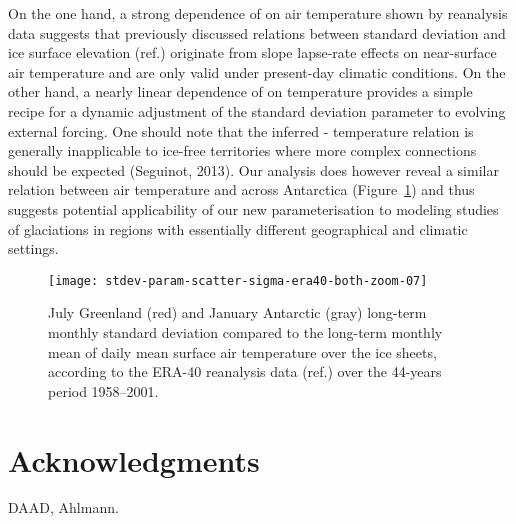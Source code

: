 \documentclass[review]{igs}
\begin{document}
On the one hand, a strong dependence of  on air temperature shown by reanalysis data suggests that previously discussed relations between standard deviation and ice surface elevation (ref.) originate from slope lapse-rate effects on near-surface air temperature and are only valid under present-day climatic conditions. On the other hand, a nearly linear dependence of  on temperature provides a simple recipe for a dynamic adjustment of the standard deviation parameter to evolving external forcing. One should note that the inferred  - temperature relation is generally inapplicable to ice-free territories where more complex connections should be expected (Seguinot, 2013). Our analysis does however reveal a similar relation between air temperature and  across Antarctica (Figure~\ref{fig:both}) and thus suggests potential applicability of our new parameterisation to modeling studies of glaciations in regions with essentially different geographical and climatic settings.

\begin{figure}
    \centering\texttt{[image: stdev-param-scatter-sigma-era40-both-zoom-07]}
    \caption{July Greenland (red) and January Antarctic (gray) long-term monthly standard deviation compared to the long-term monthly mean of daily mean surface air temperature over the  ice sheets, according to the ERA-40 reanalysis data (ref.) over the 44-years period 1958–2001.}
    \label{fig:both}
\end{figure}


\section{Acknowledgments}

DAAD, Ahlmann.



\end{document}
